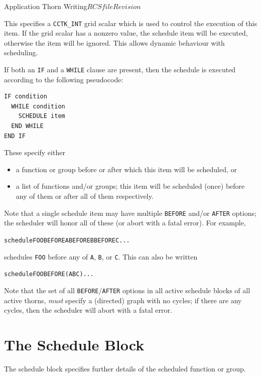 \begin{cactuspart}{Application Thorn Writing}{$RCSfile$}{$Revision$}
\begin{Lentry}
\item[\texttt{IF}]
This specifies a \texttt{CCTK\_INT} grid scalar which is used to
control the execution of this item.  If the grid scalar has a
nonzero value, the schedule item will be executed, otherwise the item
will be ignored.  This allows dynamic behaviour with scheduling.

If both an \texttt{IF} and a \texttt{WHILE} clause are present, then
the schedule is executed according to the following pseudocode:
\begin{verbatim}
IF condition
  WHILE condition
    SCHEDULE item
  END WHILE
END IF
\end{verbatim}

\item[\texttt{BEFORE} or \texttt{AFTER}]
These specify either
\begin{itemize}
\item   a function or group before or after which this item will be
        scheduled, or
\item   a list of functions and/or groups; this item will be scheduled
        (once) before any of them or after all of them respectively.
\end{itemize}
Note that a single schedule item may have multiple \texttt{BEFORE}
and/or \texttt{AFTER} options; the scheduler will honor all of these
(or abort with a fatal error).  For example,
\begin{alltt}
schedule FOO BEFORE A BEFORE B BEFORE C ...
\end{alltt}
schedules \texttt{FOO} before any of \texttt{A}, \texttt{B}, or \texttt{C}.
This can also be written
\begin{alltt}
schedule FOO BEFORE (A B C) ...
\end{alltt}

Note that the set of all \texttt{BEFORE}/\texttt{AFTER} options in
all active schedule blocks of all active thorns, \emph{must} specify
a (directed) graph with no cycles; if there are any cycles, then the
scheduler will abort with a fatal error.
\end{Lentry}


\section{The Schedule Block}
\label{scheduling:schedule_block}

The schedule block specifies further details of the scheduled function
or group.


\end{cactuspart}
